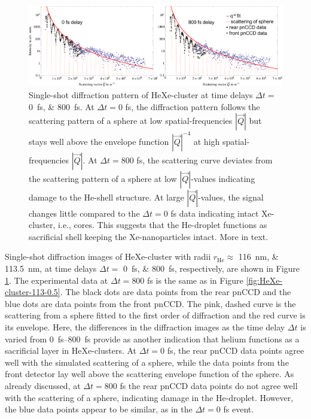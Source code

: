\begin{figure}
	\centering
		\includegraphics[width=1.00\textwidth]{images/results/HeXe-comparison-0-800-fs.png}
	\caption[Single-shot diffraction patterns of HeXe-cluster at different time delays]{Single-shot diffraction pattern of HeXe-cluster at time delays $\Delta t =$ 
	\SIlist{0;800}{\femto\second}. At $\Delta t=0$ fs, the diffraction pattern follows the scattering pattern of a sphere at low spatial-frequencies $\left|\vec{Q}\right|$ but stays well above the envelope function $\left|\vec{Q}\right|^{-4}$ at high spatial-frequencies $\left|\vec{Q}\right|$. At $\Delta t=800$ fs, the scattering curve deviates from the scattering pattern of a sphere at low $\left|\vec{Q}\right|$-values indicating damage to the He-shell structure. At large $\left|\vec{Q}\right|$-values, the signal changes little compared to the $\Delta t=0$ fs data indicating intact Xe-cluster, i.e., cores. This suggests that the He-droplet functions as sacrificial shell keeping the Xe-nanoparticles intact. More in text.}
	\label{fig:HeXe-comparison-0-800-fs}
\end{figure}
%
Single-shot diffraction images of HeXe-cluster with radii $r_{\text{He}}\approx$ \SIlist{116;113.5}{\nano\meter}, at time delays $\Delta t =$ \SIlist{0;800}{\femto\second}, respectively, are shown in Figure \ref{fig:HeXe-comparison-0-800-fs}. The experimental data at $\Delta t = 800$ fs is the same as in Figure \ref{fig:HeXe-cluster-113-0.5}. The black dots are data points from the rear pnCCD and the blue dots are data points from the front pnCCD. The pink, dashed curve is the scattering from a sphere fitted to the first order of diffraction and the red curve is its envelope. Here, the differences in the diffraction images as the time delay $\Delta t$ is varied from \SIrange{0}{800}{\femto\second} provide as another indication that helium functions as a sacrificial layer in HeXe-clusters. At $\Delta t=0$ fs, the rear pnCCD data points agree well with the simulated scattering of a sphere, while the data points from the front detector lay well above the scattering envelope function of the sphere. As already discussed, at $\Delta t = 800$ fs the rear pnCCD data points do not agree well with the scattering of a sphere, indicating damage in the He-droplet. However, the blue data points appear to be similar, as in the $\Delta t=0$ fs event.\\[1\baselineskip]
